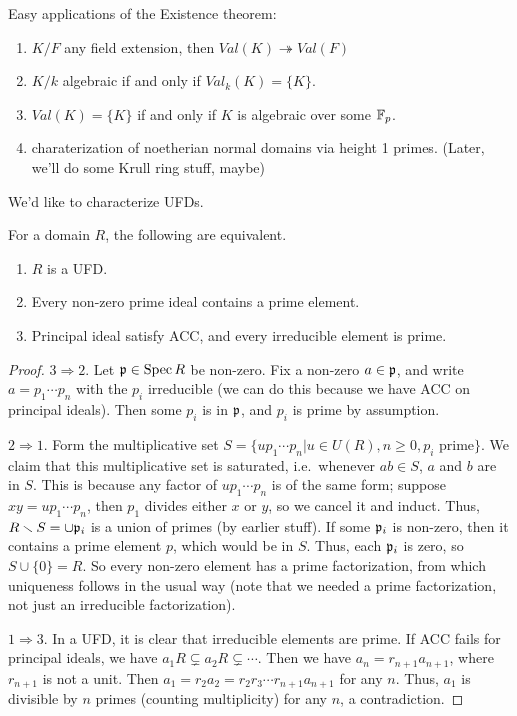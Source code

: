  \setcounter{lecture}{37}

 Easy applications of the Existence theorem:
 \begin{enumerate}
   \item $K/F$ any field extension, then $Val(K)\twoheadrightarrow Val(F)$
   \item $K/k$ algebraic if and only if $Val_k(K)=\{K\}$.
   \item $Val(K)=\{K\}$ if and only if $K$ is algebraic over some $\mathbb{F}_p$.
   \item charaterization of noetherian normal domains via height 1 primes. (Later, we'll
   do some Krull ring stuff, maybe)
 \end{enumerate}

 We'd like to characterize UFDs.
 \begin{theorem}
   For a domain $R$, the following are equivalent.
   \begin{enumerate}
     \item $R$ is a UFD.
     \item Every non-zero prime ideal contains a prime element.
     \item Principal ideal satisfy ACC, and every irreducible element is prime.
   \end{enumerate}
 \end{theorem}
 \begin{proof}
   $3\Rightarrow 2$. Let $\mathfrak{p}\in \operatorname{Spec} R$ be non-zero. Fix a non-zero $a\in \mathfrak{p}$, and write
   $a=p_1\cdots p_n$ with the $p_i$ irreducible (we can do this because we have ACC on
   principal ideals). Then some $p_i$ is in $\mathfrak{p}$, and $p_i$ is prime by assumption.

   $2\Rightarrow 1$. Form the multiplicative set $S=\{up_1\cdots p_n|u\in U(R), n\ge 0,
   p_i \text{ prime}\}$. We claim that this multiplicative set is saturated,
   i.e.~whenever $ab\in S$, $a$ and $b$ are in $S$. This is because any factor of
   $up_1\cdots p_n$ is of the same form; suppose $xy=up_1\cdots p_n$, then $p_1$ divides
   either $x$ or $y$, so we cancel it and induct. Thus, $R\smallsetminus S=\cup \mathfrak{p}_i$ is
   a union of primes (by earlier stuff). If some $\mathfrak{p}_i$ is non-zero, then it contains a
   prime element $p$, which would be in $S$. Thus, each $\mathfrak{p}_i$ is zero, so
   $S\cup\{0\}=R$. So every non-zero element has a prime factorization, from which
   uniqueness follows in the usual way (note that we needed a prime factorization, not
   just an irreducible factorization).

   $1\Rightarrow 3$. In a UFD, it is clear that irreducible elements are prime. If ACC
   fails for principal ideals, we have $a_1R\subsetneq a_2R \subsetneq \cdots$. Then we
   have $a_n=r_{n+1} a_{n+1}$, where $r_{n+1}$ is not a unit. Then
   $a_1=r_2a_2=r_2r_3\cdots r_{n+1}a_{n+1}$ for any $n$. Thus, $a_1$ is divisible by $n$
   primes (counting multiplicity) for any $n$, a contradiction.
 \end{proof}
